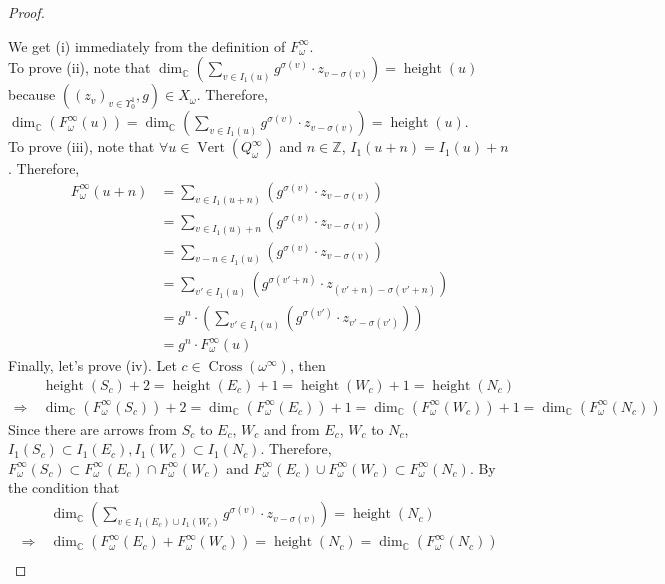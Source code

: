 \begin{proof}
\begin{enumerate}[label = (\roman*)]
\end{enumerate}
We get (\Rn{1}) immediately from the definition of $F_\omega^\infty$.\\
To prove (\Rn{2}), note that $\operatorname{dim}_\mathbb{C}(\sum_{v\in I_1(u)} g^{\sigma(v)}\cdot z_{v-\sigma(v)})=\operatorname{height}(u)$ because $((z_v)_{v\in \Upsilon_0^1},g)\in X_\omega$. Therefore, $\operatorname{dim}_\mathbb{C}(F_\omega^\infty(u)) = \operatorname{dim}_\mathbb{C}(\sum_{v\in I_1(u)} g^{\sigma(v)}\cdot z_{v-\sigma(v)})=\operatorname{height}(u)$.\\
To prove (\Rn{3}), note that $\forall u\in \operatorname{Vert}(Q_\omega^\infty)$ and $n\in \mathbb{Z}$, $I_1(u+n) = I_1(u) + n$. Therefore, 
\begin{align*}
	F_\omega^\infty(u+n) &= \sum_{v \in I_1(u+n)} (g^{\sigma(v)}\cdot z_{v - \sigma(v)})\\
	&= \sum_{v \in I_1(u)+n} (g^{\sigma(v)}\cdot z_{v - \sigma(v)})\\
	&= \sum_{v-n \in I_1(u)} (g^{\sigma(v)}\cdot z_{v - \sigma(v)})\\
	&= \sum_{v' \in I_1(u)} (g^{\sigma(v'+n)}\cdot z_{(v'+n) - \sigma(v'+n)})\\
	&= g^n \cdot (\sum_{v' \in I_1(u)} (g^{\sigma(v')}\cdot z_{v' - \sigma(v')}))\\
	&= g^n \cdot F_\omega^\infty(u)
\end{align*}
Finally, let's prove (\Rn{4}). Let $c\in \operatorname{Cross}(\omega^\infty)$, then
\begin{align*}
&\operatorname{height}(S_c) + 2 = \operatorname{height}(E_c)+1 = \operatorname{height}(W_c)+1 = \operatorname{height}(N_c)\\
\Rightarrow~& \operatorname{dim}_\mathbb{C}(F_\omega^\infty(S_c)) + 2 = \operatorname{dim}_\mathbb{C}(F_\omega^\infty(E_c))+1 = \operatorname{dim}_\mathbb{C}(F_\omega^\infty(W_c))+1 = \operatorname{dim}_\mathbb{C}(F_\omega^\infty(N_c))
\end{align*}
Since there are arrows from $S_c$ to $E_c$, $W_c$ and from $E_c$, $W_c$ to $N_c$, $I_1(S_c)\subset I_1(E_c),I_1(W_c)\subset I_1(N_c)$. Therefore, $F_\omega^\infty(S_c)\subset F_\omega^\infty(E_c)\cap F_\omega^\infty(W_c)$ and $F_\omega^\infty(E_c)\cup F_\omega^\infty(W_c)\subset F_\omega^\infty(N_c)$. By the condition that 
\begin{align*}
&\operatorname{dim}_\mathbb{C}(\sum_{v\in I_1(E_c)\cup I_1(W_c)}g^{\sigma(v)}\cdot z_{v-\sigma(v)}) = \operatorname{height}(N_c)\\
\Rightarrow~& \operatorname{dim}_\mathbb{C}(F_\omega^\infty(E_c) + F_\omega^\infty(W_c))=\operatorname{height}(N_c)=\operatorname{dim}_\mathbb{C}(F_\omega^\infty(N_c))\\

\end{align*}
\end{proof}
